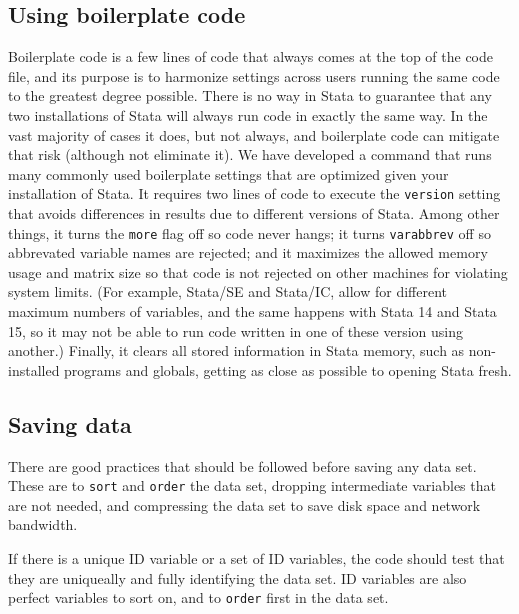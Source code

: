 
\subsection{Using boilerplate code}

Boilerplate code is a few lines of code that always comes at the top of the code file,
and its purpose is to harmonize settings across users running the same code to the greatest degree possible. There is no way in Stata to guarantee that any two installations of Stata
will always run code in exactly the same way.
In the vast majority of cases it does, but not always,
and boilerplate code can mitigate that risk (although not eliminate it).
We have developed a command that runs many commonly used boilerplate settings
that are optimized given your installation of Stata.
It requires two lines of code to execute the \texttt{version}
setting that avoids differences in results due to different versions of Stata.
Among other things, it turns the \texttt{more} flag off so code never hangs;
it turns \texttt{varabbrev} off so abbrevated variable names are rejected;
and it maximizes the allowed memory usage and matrix size
so that code is not rejected on other machines for violating system limits.
(For example, Stata/SE and Stata/IC, allow for different maximum numbers of variables,
and the same happens with Stata 14 and Stata 15,
so it may not be able to run code written in one of these version using another.)
Finally, it clears all stored information in Stata memory,
such as non-installed programs and globals,
getting as close as possible to opening Stata fresh.


\subsection{Saving data}

There are good practices that should be followed before saving any data set.
These are to \texttt{sort} and \texttt{order} the data set,
dropping intermediate variables that are not needed,
and compressing the data set to save disk space and network bandwidth.

If there is a unique ID variable or a set of ID variables,
the code should test that they are uniqueally and
fully identifying the data set.
ID variables are also perfect variables to sort on,
and to \texttt{order} first in the data set.

